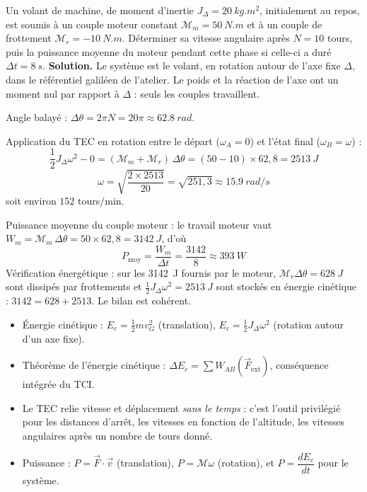 \documentclass[11pt]{article}
\begin{document}
\begin{exoresolu}
Un volant de machine, de moment d'inertie $J_\Delta = \SI{20}{kg.m^2}$, initialement au repos, est soumis à un couple moteur constant $\mathcal{M}_m = \SI{50}{N.m}$ et à un couple de frottement $\mathcal{M}_r = \SI{-10}{N.m}$. Déterminer sa vitesse angulaire après $N = 10$ tours, puis la puissance moyenne du moteur pendant cette phase si celle-ci a duré $\Delta t = \SI{8}{s}$.
\tcblower
\textbf{Solution.} Le système est le volant, en rotation autour de l'axe fixe $\Delta$, dans le référentiel galiléen de l'atelier. Le poids et la réaction de l'axe ont un moment nul par rapport à $\Delta$ : seuls les couples travaillent.

Angle balayé : $\Delta\theta = 2\pi N = 20\pi \approx \SI{62,8}{rad}$.

Application du TEC en rotation entre le départ ($\omega_A = 0$) et l'état final ($\omega_B = \omega$) :
\[ \frac{1}{2}J_\Delta \omega^2 - 0 = (\mathcal{M}_m + \mathcal{M}_r)\,\Delta\theta = (50 - 10)\times 62{,}8 = \SI{2513}{J} \]
\[ \omega = \sqrt{\frac{2 \times 2513}{20}} = \sqrt{251{,}3} \approx \SI{15,9}{rad/s} \]
soit environ $152$ tours/min.

Puissance moyenne du couple moteur : le travail moteur vaut $W_m = \mathcal{M}_m\,\Delta\theta = 50 \times 62{,}8 = \SI{3142}{J}$, d'où
\[ P_{\text{moy}} = \frac{W_m}{\Delta t} = \frac{3142}{8} \approx \SI{393}{W} \]
Vérification énergétique : sur les \SI{3142}{J} fournis par le moteur, $\mathcal{M}_r\Delta\theta = \SI{628}{J}$ sont dissipés par frottements et $\tfrac12 J_\Delta\omega^2 = \SI{2513}{J}$ sont stockés en énergie cinétique : $3142 = 628 + 2513$. Le bilan est cohérent.
\end{exoresolu}

\begin{aretenir}[L'essentiel]
\begin{itemize}
\item Énergie cinétique : $E_c = \tfrac12 m v_G^2$ (translation), $E_c = \tfrac12 J_\Delta \omega^2$ (rotation autour d'un axe fixe).
\item Théorème de l'énergie cinétique : $\Delta E_c = \sum W_{AB}(\vec{F}_{\mathrm{ext}})$, conséquence intégrée du TCI.
\item Le TEC relie vitesse et déplacement \emph{sans le temps} : c'est l'outil privilégié pour les distances d'arrêt, les vitesses en fonction de l'altitude, les vitesses angulaires après un nombre de tours donné.
\item Puissance : $P = \vec F\cdot\vec v$ (translation), $P = \mathcal{M}\omega$ (rotation), et $P = \dfrac{dE_c}{dt}$ pour le système.
\end{itemize}
\end{aretenir}
\end{document}
